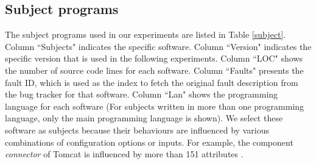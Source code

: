 \documentclass{sig-alternate-05-2015}
\begin{document}
{{%

%

\subsection{Subject programs}\label{sec:subject}
The subject programs used in our experiments are listed in Table \ref{subject}. Column ``Subjects" indicates the specific software. Column ``Version" indicates the specific version that is used in the following experiments. Column ``LOC" shows the number of source code lines for each software. Column ``Faults" presents the fault ID, which is used as the index to fetch the original fault description from the bug tracker for that software. Column ``Lan" shows the programming language for each software (For subjects written in more than one programming language, only the main programming language is shown).  We select these software as subjects because their behaviours are influenced by various combinations of configuration options or inputs. For example, the component \emph{connector} of Tomcat is influenced by more than 151 attributes \cite{tomcatconnector}.

}}
\end{document}
